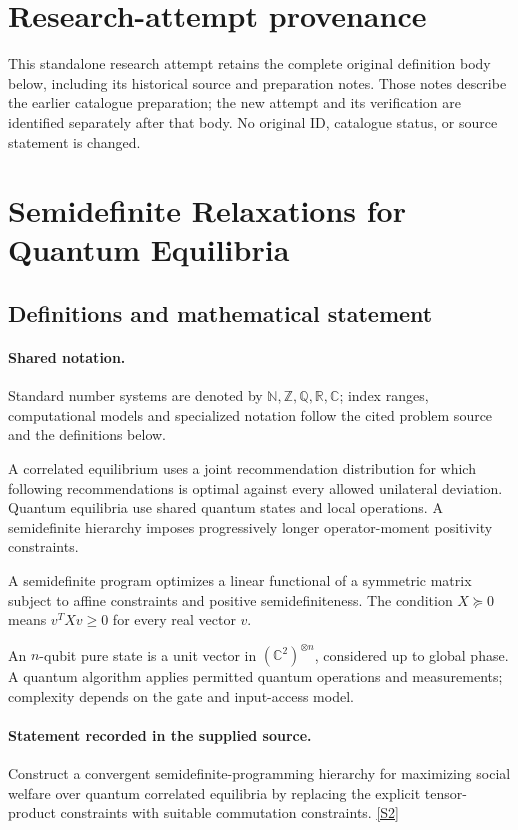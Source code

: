\documentclass[11pt]{article}
\begin{document}
\section*{Research-attempt provenance}
This standalone research attempt retains the complete original definition body below,
including its historical source and preparation notes. Those notes describe the
earlier catalogue preparation; the new attempt and its verification are identified
separately after that body. No original ID, catalogue status, or source statement is changed.

\section{Semidefinite Relaxations for Quantum Equilibria}\label{statement}

\subsection{Definitions and mathematical statement}

\paragraph{Shared notation.}Standard number systems are denoted by $\mathbb N,\mathbb Z,\mathbb Q,\mathbb R,\mathbb C$; index ranges, computational models and specialized notation follow the cited problem source and the definitions below.


A correlated equilibrium uses a joint recommendation distribution for which following recommendations is optimal against every allowed unilateral deviation. Quantum equilibria use shared quantum states and local operations. A semidefinite hierarchy imposes progressively longer operator-moment positivity constraints.

A semidefinite program optimizes a linear functional of a symmetric matrix subject to affine constraints and positive semidefiniteness. The condition $X\succeq0$ means $v^TXv\geq0$ for every real vector $v$.

An $n$-qubit pure state is a unit vector in $(\mathbb C^2)^{\otimes n}$, considered up to global phase. A quantum algorithm applies permitted quantum operations and measurements; complexity depends on the gate and input-access model.
\paragraph{Statement recorded in the supplied source.}
Construct a convergent semidefinite-programming hierarchy for maximizing social welfare over quantum correlated equilibria by replacing the explicit tensor-product constraints with suitable commutation constraints. \href{https://doi.org/10.4171/owr/2026/4}{[S2]}
\end{document}
